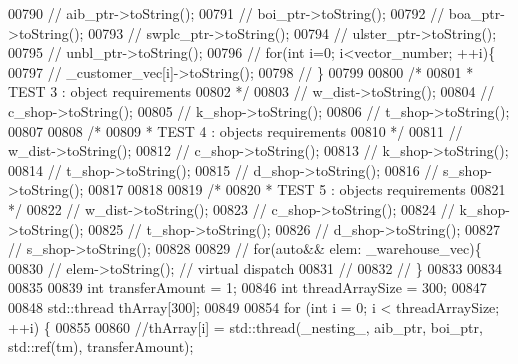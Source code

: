 \begin{DoxyCode}
00790     \textcolor{comment}{//    aib\_ptr->toString();}
00791     \textcolor{comment}{//    boi\_ptr->toString();}
00792     \textcolor{comment}{//    boa\_ptr->toString();}
00793     \textcolor{comment}{//    swplc\_ptr->toString();}
00794     \textcolor{comment}{//    ulster\_ptr->toString();}
00795     \textcolor{comment}{//    unbl\_ptr->toString();}
00796     \textcolor{comment}{//    for(int i=0; i<vector\_number; ++i)\{}
00797     \textcolor{comment}{//        \_customer\_vec[i]->toString();}
00798     \textcolor{comment}{//    \}}
00799 
00800     \textcolor{comment}{/*}
00801 \textcolor{comment}{     * TEST 3 : object requirements}
00802 \textcolor{comment}{     */}
00803     \textcolor{comment}{//    w\_dist->toString();}
00804     \textcolor{comment}{//    c\_shop->toString();}
00805     \textcolor{comment}{//    k\_shop->toString();}
00806     \textcolor{comment}{//    t\_shop->toString();}
00807 
00808     \textcolor{comment}{/*}
00809 \textcolor{comment}{     * TEST 4 : objects requirements}
00810 \textcolor{comment}{     */}
00811     \textcolor{comment}{//        w\_dist->toString();}
00812     \textcolor{comment}{//        c\_shop->toString();}
00813     \textcolor{comment}{//        k\_shop->toString();}
00814     \textcolor{comment}{//        t\_shop->toString();}
00815     \textcolor{comment}{//        d\_shop->toString();}
00816     \textcolor{comment}{//        s\_shop->toString();}
00817 
00818 
00819     \textcolor{comment}{/*}
00820 \textcolor{comment}{     * TEST 5 : objects requirements}
00821 \textcolor{comment}{     */}
00822     \textcolor{comment}{//        w\_dist->toString();}
00823     \textcolor{comment}{//        c\_shop->toString();}
00824     \textcolor{comment}{//        k\_shop->toString();}
00825     \textcolor{comment}{//        t\_shop->toString();}
00826     \textcolor{comment}{//        d\_shop->toString();}
00827     \textcolor{comment}{//        s\_shop->toString();}
00828 
00829     \textcolor{comment}{//        for(auto&& elem: \_warehouse\_vec)\{}
00830     \textcolor{comment}{//            elem->toString(); // virtual dispatch}
00831     \textcolor{comment}{//            }
00832     \textcolor{comment}{//        \}}
00833 
00834 
00835 
00839     \textcolor{keywordtype}{int} transferAmount = 1;
00846     \textcolor{keywordtype}{int} threadArraySize = 300;
00847 
00848     std::thread thArray[300];
00849 
00854     \textcolor{keywordflow}{for} (\textcolor{keywordtype}{int} i = 0; i < threadArraySize; ++i) \{
00855 
00860         \textcolor{comment}{//thArray[i] = std::thread(\_nesting\_, aib\_ptr, boi\_ptr, std::ref(tm), transferAmount);}

\end{DoxyCode}
